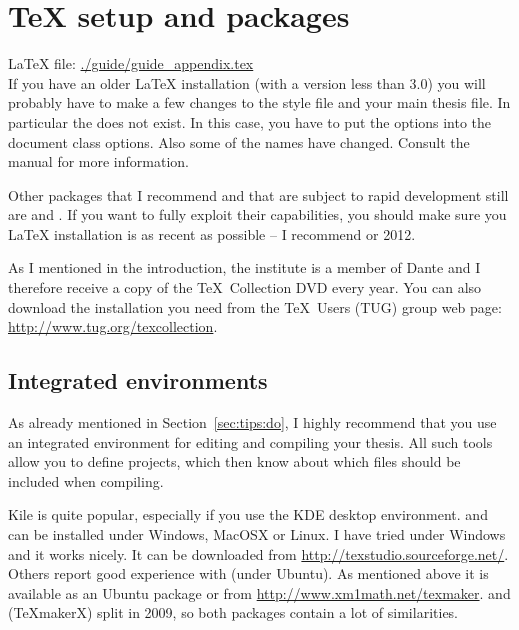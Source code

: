 \chapter{\TeX{} setup and packages}
\label{sec:app:tex}

\LaTeX{} file: \url{./guide/guide_appendix.tex}\\[1ex]
\noindent
If you have an older \LaTeX{} installation (with a \KOMAScript{}
version less than 3.0) you will probably have to make a few changes to
the style file and your main thesis file.
In particular the  does not exist. In this case, you
have to put the options into the document class options. Also some of
the names have changed. Consult the \KOMAScript{} manual for more
information.

Other packages that I recommend and that are subject to rapid
development still are  and
. If you want to fully exploit their capabilities,
you should make sure you \LaTeX{} installation is as recent as
possible -- I recommend  or 2012.

As I mentioned in the introduction, the institute is a member of Dante
and I therefore receive a copy of the \TeX\ Collection DVD every
year. You can also download the installation you need from the \TeX\
Users (TUG) group web page: \url{http://www.tug.org/texcollection}.

\section{Integrated environments}
\label{sec:app:complile}

As already mentioned in Section~\ref{sec:tips:do}, I highly recommend
that you use an integrated environment for editing and compiling your
thesis. All such tools allow you to define projects, which then know
about which files should be included when compiling.

Kile is quite popular, especially if you use the KDE
desktop environment. \TeXstudio\index{TeXstudio} and
\TeXmaker{} can be installed under Windows, MacOSX or
Linux. I have tried \TeXstudio under Windows and it works nicely. It
can be downloaded from \url{http://texstudio.sourceforge.net/}. Others
report good experience with \TeXmaker (under Ubuntu). As mentioned
above it is available as an Ubuntu package or from
\url{http://www.xm1math.net/texmaker}.
\TeXmaker and \TeXstudio (\TeX makerX) split in 2009, so both packages
contain a lot of similarities.

